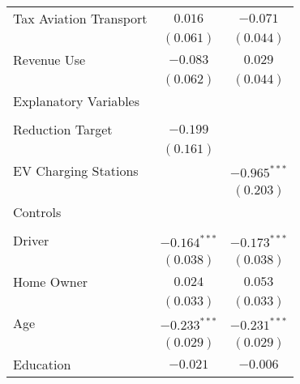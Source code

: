 \begin{center}
\begin{tiny}
\begin{longtable}{l@{} c@{} c@{}}
\quad Tax Aviation Transport                              & $0.016$          & $-0.071$         \\
                                                          & $(0.061)$        & $(0.044)$        \\
\quad Revenue Use                                         & $-0.083$         & $0.029$          \\
                                                          & $(0.062)$        & $(0.044)$        \\
Explanatory Variables                                     &                  &                  \\
                                                          &                  &                  \\
\quad Reduction Target                                    & $-0.199$         &                  \\
                                                          & $(0.161)$        &                  \\
\quad EV Charging Stations                                &                  & $-0.965^{***}$   \\
                                                          &                  & $(0.203)$        \\
Controls                                                  &                  &                  \\
                                                          &                  &                  \\
\quad Driver                                              & $-0.164^{***}$   & $-0.173^{***}$   \\
                                                          & $(0.038)$        & $(0.038)$        \\
\quad Home Owner                                          & $0.024$          & $0.053$          \\
                                                          & $(0.033)$        & $(0.033)$        \\
\quad Age                                                 & $-0.233^{***}$   & $-0.231^{***}$   \\
                                                          & $(0.029)$        & $(0.029)$        \\
\quad Education                                           & $-0.021$         & $-0.006$         \\

\end{longtable}
\end{tiny}
\end{center}
